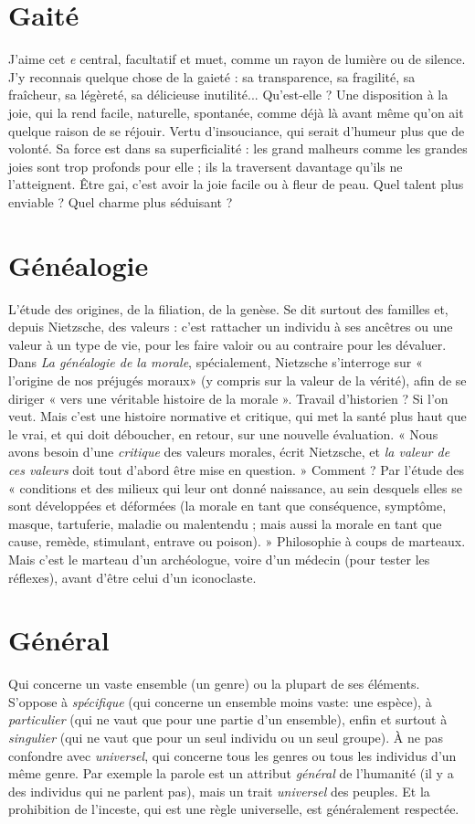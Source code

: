 \section{Gaité}
J'aime cet {\it e} central, facultatif et muet, comme un rayon de
lumière ou de silence. J’y reconnais quelque chose de la gaieté : sa
transparence, sa fragilité, sa fraîcheur, sa légèreté, sa délicieuse inutilité...
Qu’est-elle ? Une disposition à la joie, qui la rend facile, naturelle, spontanée,
comme déjà là avant même qu’on ait quelque raison de se réjouir. Vertu
d’insouciance, qui serait d’humeur plus que de volonté. Sa force est dans sa
superficialité : les grand malheurs comme les grandes joies sont trop profonds
pour elle ; ils la traversent davantage qu’ils ne l’atteignent. Être gai, c’est avoir
la joie facile ou à fleur de peau. Quel talent plus enviable ? Quel charme plus
séduisant ?

\section{Généalogie}
L'étude des origines, de la filiation, de la genèse. Se dit surtout
des familles et, depuis Nietzsche, des valeurs : c’est rattacher
un individu à ses ancêtres ou une valeur à un type de vie, pour les faire
valoir ou au contraire pour les dévaluer. Dans {\it La généalogie de la morale}, spécialement,
Nietzsche s'interroge sur « l’origine de nos préjugés moraux» (y
compris sur la valeur de la vérité), afin de se diriger « vers une véritable histoire
de la morale ». Travail d’historien ? Si l’on veut. Mais c’est une histoire normative
et critique, qui met la santé plus haut que le vrai, et qui doit déboucher, en
retour, sur une nouvelle évaluation. « Nous avons besoin d’une {\it critique} des
valeurs morales, écrit Nietzsche, et {\it la valeur de ces valeurs} doit tout d’abord être
mise en question. » Comment ? Par l’étude des « conditions et des milieux qui
leur ont donné naissance, au sein desquels elles se sont développées et déformées
(la morale en tant que conséquence, symptôme, masque, tartuferie,
maladie ou malentendu ; mais aussi la morale en tant que cause, remède, stimulant,
entrave ou poison). » Philosophie à coups de marteaux. Mais c’est le
marteau d’un archéologue, voire d’un médecin (pour tester les réflexes), avant
d’être celui d’un iconoclaste.

\section{Général}
Qui concerne un vaste ensemble (un genre) ou la plupart de ses
éléments. S'oppose à {\it spécifique} (qui concerne un ensemble moins
vaste: une espèce), à {\it particulier} (qui ne vaut que pour une partie d’un
ensemble), enfin et surtout à {\it singulier} (qui ne vaut que pour un seul individu
ou un seul groupe). À ne pas confondre avec {\it universel}, qui concerne tous les
genres ou tous les individus d’un même genre. Par exemple la parole est un
attribut {\it général} de l'humanité (il y a des individus qui ne parlent pas), mais un
trait {\it universel} des peuples. Et la prohibition de l'inceste, qui est une règle universelle,
est généralement respectée.


